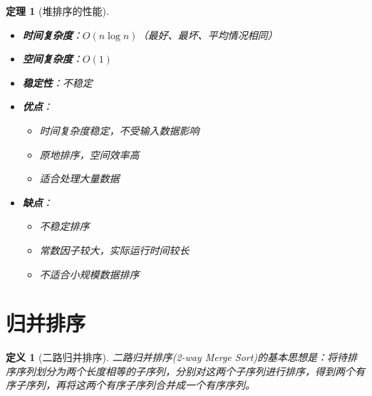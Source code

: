 \documentclass[12pt,a4paper]{amsart}
\newtheorem{definition}{定义}[section]
\newtheorem{theorem}{定理}[section]
\begin{document}
\begin{theorem}[堆排序的性能]
\indent
\begin{itemize}
\item \textbf{时间复杂度}：$O(n\log n)$（最好、最坏、平均情况相同）
\item \textbf{空间复杂度}：$O(1)$
\item \textbf{稳定性}：不稳定
\item \textbf{优点}：
    \begin{itemize}
    \item 时间复杂度稳定，不受输入数据影响
    \item 原地排序，空间效率高
    \item 适合处理大量数据
    \end{itemize}
\item \textbf{缺点}：
    \begin{itemize}
    \item 不稳定排序
    \item 常数因子较大，实际运行时间较长
    \item 不适合小规模数据排序
    \end{itemize}
\end{itemize}
\end{theorem}

\section{归并排序}

\begin{definition}[二路归并排序]
二路归并排序(2-way Merge Sort)的基本思想是：将待排序序列划分为两个长度相等的子序列，分别对这两个子序列进行排序，得到两个有序子序列，再将这两个有序子序列合并成一个有序序列。
\end{definition}
\end{document}

